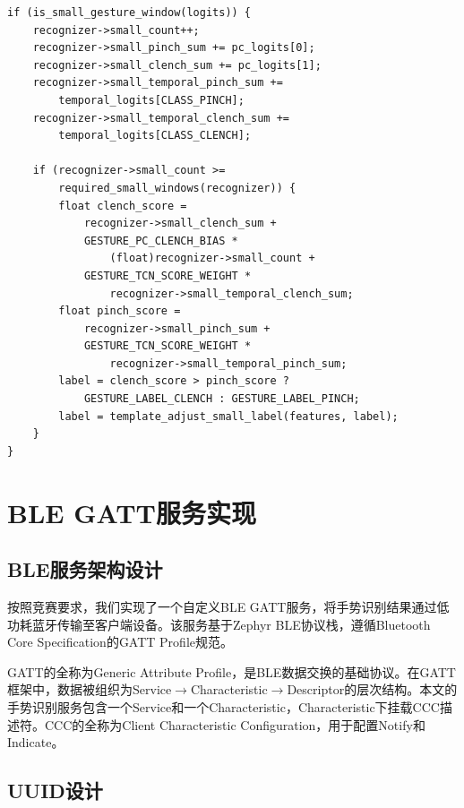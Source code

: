 \documentclass[lettersize,journal]{IEEEtran}
\begin{document}
\begin{lstlisting}[caption={pinch/clench小手势决策核心逻辑（gesture\_algorithm.c）},label={lst:small_decision}]
if (is_small_gesture_window(logits)) {
    recognizer->small_count++;
    recognizer->small_pinch_sum += pc_logits[0];
    recognizer->small_clench_sum += pc_logits[1];
    recognizer->small_temporal_pinch_sum +=
        temporal_logits[CLASS_PINCH];
    recognizer->small_temporal_clench_sum +=
        temporal_logits[CLASS_CLENCH];

    if (recognizer->small_count >=
        required_small_windows(recognizer)) {
        float clench_score =
            recognizer->small_clench_sum +
            GESTURE_PC_CLENCH_BIAS *
                (float)recognizer->small_count +
            GESTURE_TCN_SCORE_WEIGHT *
                recognizer->small_temporal_clench_sum;
        float pinch_score =
            recognizer->small_pinch_sum +
            GESTURE_TCN_SCORE_WEIGHT *
                recognizer->small_temporal_pinch_sum;
        label = clench_score > pinch_score ?
            GESTURE_LABEL_CLENCH : GESTURE_LABEL_PINCH;
        label = template_adjust_small_label(features, label);
    }
}
\end{lstlisting}

\section{BLE GATT服务实现}
\label{sec:ble}

\subsection{BLE服务架构设计}

按照竞赛要求，我们实现了一个自定义BLE GATT服务，将手势识别结果通过低功耗蓝牙传输至客户端设备。该服务基于Zephyr BLE协议栈\cite{zephyr_ble}，遵循Bluetooth Core Specification的GATT Profile规范。

GATT的全称为Generic Attribute Profile，是BLE数据交换的基础协议。在GATT框架中，数据被组织为Service$\to$Characteristic$\to$Descriptor的层次结构。本文的手势识别服务包含一个Service和一个Characteristic，Characteristic下挂载CCC描述符。CCC的全称为Client Characteristic Configuration，用于配置Notify和Indicate。

\subsection{UUID设计}
\end{document}
